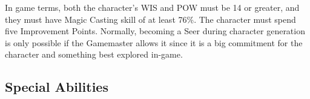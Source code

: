 In game terms, both the character's WIS and POW must be 14 or greater, and they must have Magic Casting skill of at least 76\%. The character must spend five Improvement Points. Normally, becoming a Seer during character generation is only possible if the Gamemaster allows it since it is a big commitment for the character and something best explored in-game.

\subsection{Special Abilities}


